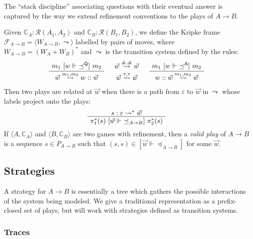 The ``stack discipline'' associating questions
with their eventual answer is captured by
the way we extend refinement conventions to
the plays of $A \rightarrow B$.

\begin{definition}
Given
$\mathbb{C}_A : \mathcal{R}(A_1, A_2)$ and
$\mathbb{C}_B : \mathcal{R}(B_1, B_2)$,
we define the Kripke frame
$\mathcal{F}_{A \rightarrow B} =
 \langle W_{A \rightarrow B}, \leadsto \rangle$
labelled by pairs of moves,
where $W_{A \rightarrow B} = (W_A + W_B)^*$
and $\leadsto$ is the transition system
defined by the rules:
\[
    \AxiomC{$m_1 \ifr{w \Vdash {\preceq}^\kw{Q}} m_2$}
    \UnaryInfC{$\vec{w} \stackrel{m_1, m_2}{\leadsto} w :: \vec{w}$}
    \DisplayProof
    \quad
    \begin{array}{c}
      \vec{w} \stackrel{\#,\#}{\leadsto} \vec{w} \\[0.7ex]
      \vec{w} \stackrel{\tau, \tau}{\leadsto} \vec{w}
    \end{array}
    \quad
    \AxiomC{$m_1 \ifr{w \Vdash {\preceq}^\kw{A}} m_2$}
    \UnaryInfC{$w :: \vec{w} \stackrel{m_1, m_2}{\leadsto} \vec{w}$}
    \DisplayProof
\]
Then two plays are related at $\vec{w}$
when there is a path from $\varepsilon$ to $\vec{w}$
in $\leadsto$ whose labels project onto the plays:
\[
    \AxiomC{$s : \varepsilon \leadsto^* \vec{w}$}
    \UnaryInfC{$\pi_1^*(s)
       \ifr{\vec{w} \Vdash {\preceq}_{A \rightarrow B}}
       \pi_2^*(s)$}
    \DisplayProof
\]
If
$\langle A, \mathbb{C}_A \rangle$ and
$\langle B, \mathbb{C}_B \rangle$
are two games with refinement, then
a \emph{valid play} of $A \rightarrow B$
is a sequence $s \in P_{A \rightarrow B}$
such that $(s, s) \in [\vec{w} \Vdash {\preceq}_{A \rightarrow B}]$
for some $\vec{w}$.
\end{definition}

\subsection{Strategies}

A strategy for $A \rightarrow B$
is essentially a tree
which gathers the possible interactions of
the system being modeled.
We give a traditional representation
as a prefix-closed set of plays,
but will work with strategies defined as transition systems.

\subsubsection{Traces}

